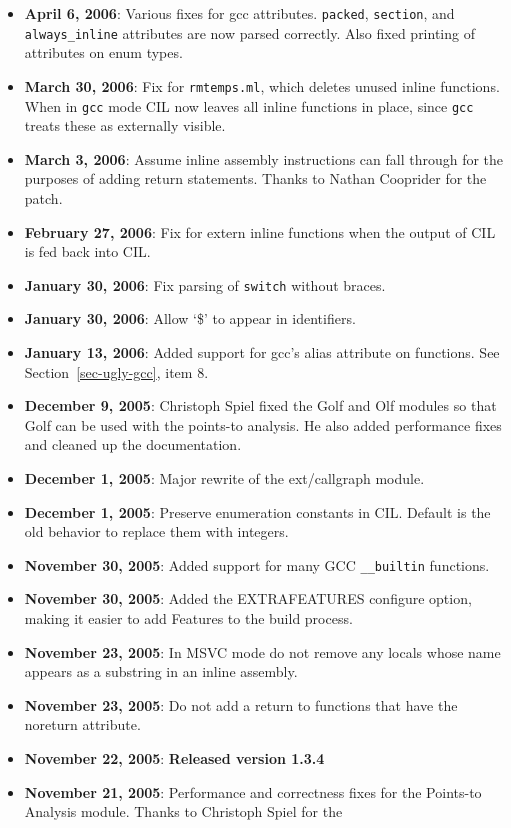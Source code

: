 \documentclass{article}
\def\secref#1{Section~\ref{sec-#1}}
\def\t#1{{\tt #1}}
\begin{document}
\begin{itemize}
\item {\bf April 6, 2006}: Various fixes for gcc attributes.
  \t{packed}, \t{section}, and \t{always\_inline} attributes are now
  parsed correctly.  Also fixed printing of attributes on enum types.
\item {\bf March 30, 2006}: Fix for \t{rmtemps.ml}, which deletes
  unused inline functions.  When in \t{gcc} mode CIL now leaves all
  inline functions in place, since \t{gcc} treats these as externally
  visible. 
\item {\bf March 3, 2006}: Assume inline assembly instructions can
  fall through for the purposes of adding return statements.  Thanks to
  Nathan Cooprider for the patch.
\item {\bf February 27, 2006}: Fix for extern inline functions when
  the output of CIL is fed back into CIL.
\item {\bf January 30, 2006}: Fix parsing of \t{switch} without braces.
\item {\bf January 30, 2006}: Allow `\$' to appear in identifiers.
\item {\bf January 13, 2006}: Added support for gcc's alias attribute
  on functions.  See \secref{ugly-gcc}, item 8.  
\item {\bf December 9, 2005}: Christoph Spiel fixed the Golf and
  Olf modules so that Golf can be used with the points-to analysis.
  He also added performance fixes and cleaned up the documentation.
\item {\bf December 1, 2005}: Major rewrite of the ext/callgraph module. 
\item {\bf December 1, 2005}: Preserve enumeration constants in CIL. Default
is the old behavior to replace them with integers.
\item {\bf November 30, 2005}: Added support for many GCC \t{\_\_builtin}
  functions. 
\item {\bf November 30, 2005}: Added the EXTRAFEATURES configure
  option, making it easier to add Features to the build process.
\item {\bf November 23, 2005}: In MSVC mode do not remove any locals whose name
  appears as a substring in an inline assembly. 
\item {\bf November 23, 2005}: Do not add a return to functions that have the
  noreturn attribute. 
\item {\bf November 22, 2005}: {\bf Released version 1.3.4}
\item {\bf November 21, 2005}: Performance and correctness fixes for
  the Points-to Analysis module.  Thanks to Christoph Spiel for the

\end{itemize}
\end{document}
